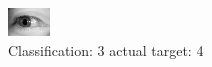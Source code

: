 \begin{figure}[h!]
\begin{center}
\includegraphics[width=0.60\columnwidth]{figures/ID3106_class_3_target_4.png}
\end{center}
\caption{ Classification: 3 actual target: 4}
\label{fig:ID3106_class_3_target_4}
\end{figure}
